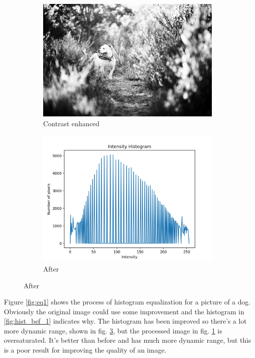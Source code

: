 \documentclass[11pt,a4paper]{article}
\begin{document}
\begin{figure}[ht]
	\ContinuedFloat
	\centering
	\begin{subfigure}[h]{0.7\textwidth}
		\includegraphics[width=\textwidth]{figs/lc1_ce}
		\caption{Contrast enhanced}
		\label{fig:lc1_after}
	\end{subfigure}
	\par\bigskip
	\begin{subfigure}[h]{0.75\textwidth}
		\includegraphics[width=\textwidth]{figs/lc1_hist_aft}
		\caption{After}
		\label{fig:hist_aft_1}
	\end{subfigure}
\end{figure}

Figure \ref{fig:eq1} shows the process of histogram equalization for a picture of a dog. Obviously the original image could use some improvement and the histogram in \ref{fig:hist_bef_1} indicates why. The histogram has been improved so there's a lot more dynamic range, shown in fig. \ref{fig:hist_aft_1}, but the processed image in fig. \ref{fig:lc1_after} is oversaturated. It's better than before and has much more dynamic range, but this is a poor result for improving the quality of an image.
\end{document}
